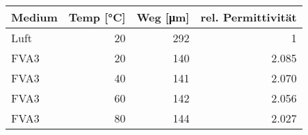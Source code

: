 \begin{tabular}{lrrr}
    Medium & Temp [\si{\degreeCelsius}] & Weg [\si{\um}] & rel. Permittivität \\ \hline
    Luft   & 20                         & 292            & 1                  \\
    FVA3   & 20                         & 140            & 2.085              \\
    FVA3   & 40                         & 141            & 2.070              \\
    FVA3   & 60                         & 142            & 2.056              \\
    FVA3   & 80                         & 144            & 2.027              \\
\end{tabular}
